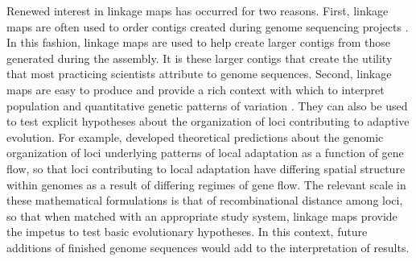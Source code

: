 \documentclass[smallextended]{svjour3}
\begin{document}
Renewed interest in linkage maps has occurred for two reasons. First, linkage
maps are often used to order contigs created during genome sequencing projects
\citep{Mackay:2012, Martinez-Garcia:2013}. In this fashion, linkage maps are
used to help create larger contigs from those generated during the assembly. It
is these larger contigs that create the utility that most practicing scientists
attribute to genome sequences. Second, linkage maps are easy to
produce and provide a rich context with which to interpret population and
quantitative genetic patterns of variation \citep[e.g.,][]{Eckert:2010a,
  Eckert:2010b, Eckert:2013a, Yeaman:2013}. They can also be used to test
explicit hypotheses about the organization of loci contributing to adaptive
evolution. For example, \citet{Yeaman:2011} developed theoretical predictions
about the genomic organization of loci underlying patterns of local adaptation
as a function of gene flow, so that loci contributing to local adaptation have
differing spatial structure within genomes as a result of differing regimes of
gene flow. The relevant scale \citep[\textit{sensu}][]{Houle:2011} in these
mathematical formulations is that of recombinational distance among loci, so
that when matched with an appropriate study system, linkage maps provide the
impetus to test basic evolutionary hypotheses. In this context, future additions
of finished genome sequences would add to the interpretation of results.
\end{document}
